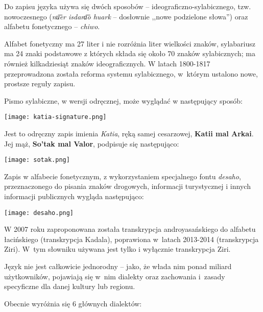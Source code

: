 \begin{spacing}{1.1}
Do zapisu języka używa się dwóch sposobów --  ideograficzno-sylabicznego,
tzw. nowoczesnego (\emph{nu͞er isdara͞o huark} -- dosłownie
,,nowe podzielone słowa'') oraz alfabetu fonetycznego -- \emph{chiwo}.

Alfabet fonetyczny ma 27 liter i nie rozróżnia liter wielkości znaków, sylabariusz 
ma 24 znaki podstawowe z których składa się około 70 znaków sylabicznych; 
ma również kilkadziesiąt znaków ideograficznych. W latach 1800-1817 przeprowadzona
została reforma systemu sylabicznego, w~którym ustalono nowe, prostsze reguły zapisu.

Pismo sylabiczne, w wersji odręcznej, może wyglądać w następujący sposób:

\begin{center}
    \texttt{[image: katia-signature.png]}    
\end{center}

Jest to odręczny zapis imienia \emph{Katia}, ręką samej cesarzowej, \textbf{Katii mal Arkai}.
Jej mąż, \textbf{So'tak mal Valor}, podpisuje się następująco:

\begin{center}
    \texttt{[image: sotak.png]}
\end{center}

Zapis w alfabecie fonetycznym, z wykorzystaniem specjalnego fontu \emph{desaho},
przeznaczonego do pisania znaków drogowych, informacji turystycznej i innych
informacji publicznych wygląda następująco:

\begin{center}
    \texttt{[image: desaho.png]}
\end{center}

\skipline

W 2007 roku zaproponowana została transkrypcja androyasańskiego do alfabetu 
łacińskiego (transkrypcja Kadala), poprawiona w~latach 2013-2014 (transkrypcja 
Ziri). W~tym słowniku używana jest tylko i wyłącznie transkrypcja Ziri.

Język nie jest całkowicie jednorodny -- jako, że włada nim ponad miliard 
użytkowników, pojawiają się w~nim dialekty oraz zachowania i~zasady specyficzne 
dla danej kultury lub regionu. 

Obecnie wyróżnia się 6 głównych dialektów: 


\end{spacing}
